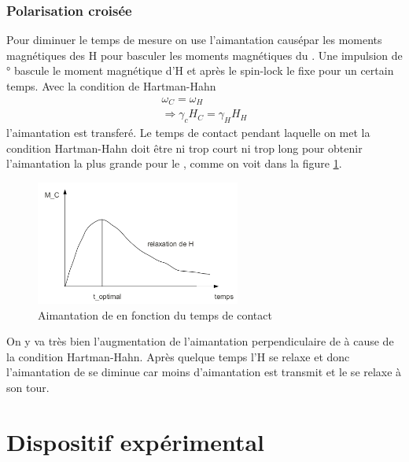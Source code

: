 \documentclass[a4paper,12pt]{scrartcl}
\begin{document}
   \subsubsection{Polarisation croisée}
    Pour diminuer le temps de mesure on use l'aimantation causépar les moments magnétiques des H pour basculer les moments magnétiques du . Une impulsion de \unit[90]{\degree} bascule le moment magnétique d'H et après le spin-lock le fixe pour un certain temps. Avec la condition de Hartman-Hahn
    \begin{eqnarray*}
     \omega_C=\omega_H\\
     \Rightarrow \gamma_c H_C=\gamma_H H_H
    \end{eqnarray*}
    l'aimantation est transferé. Le temps de contact pendant laquelle on met la condition Hartman-Hahn doit être ni trop court ni trop long pour obtenir l'aimantation la plus grande pour le , comme on voit dans la figure \ref{polarisation}. 
    \begin{figure}
     \includegraphics[width=0.6\textwidth]{bilder/schema_pol.png}
     \caption{\label{polarisation} Aimantation de  en fonction du temps de contact}
    \end{figure}
    On y va très bien l'augmentation de l'aimantation perpendiculaire de  à cause de la condition Hartman-Hahn. Après quelque temps l'H se relaxe et donc l'aimantation de  se diminue car moins d'aimantation est transmit et le  se relaxe à son tour.
     

 \section{Dispositif expérimental}
\end{document}
